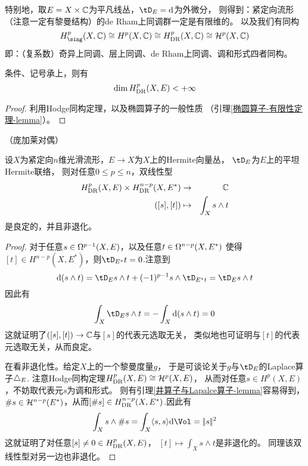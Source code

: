 
特别地，取$E=X\times\mathbb{C}$为平凡线丛，$\tD_E=\td$为外微分，
则得到：紧定向流形（注意一定有黎曼结构）的de Rham上同调群一定是有限维的。
以及我们有同构
$$
  H^p_{\sing}(X,\bbC)
\cong H^p(X,\bbC)
\cong H^p_{\DR}(X,\bbC)
\cong \mcalH^p(X,\bbC)
$$
即：（复系数）奇异上同调、层上同调、de Rham上同调、调和形式四者同构。

\begin{cor}条件、记号承上，则有
$$\dim H^{p}_{\operatorname{DR}}(X,E)<+\infty$$
\end{cor}

\begin{proof}
利用Hodge同构定理，以及椭圆算子的一般性质
（引理\ref{椭圆算子-有限性定理-lemma}）。
\end{proof}

\begin{thm}（庞加莱对偶）

设$X$为紧定向$n$维光滑流形，$E\to X$为$X$上的Hermite向量丛，
$\tD_E$为$E$上的平坦Hermite联络，
则对任意$0\leq p\leq n$，双线性型
\begin{eqnarray*}
     H^p_{\operatorname{DR}}(X,E)\times H^{n-p}_{\operatorname{DR}}(X,E^*)&\to&\mathbb{C}\\
     ([s],[t])&\mapsto&\int_Xs\wedge t
\end{eqnarray*}
是良定的，并且非退化。
\end{thm}

\begin{proof}
对于任意$s\in\Omega^{p-1}(X,E)$，以及任意$t\in\Omega^{n-p}(X,E^*)$
使得$[t]\in H^{n-p}(X,E^*)$，则$\tD_{E^*}t=0$.注意到
$$
  \td(s\wedge t)
=
  \tD_Es\wedge t+(-1)^{p-1}s\wedge\tD_{E^*t}
=
  \tD_Es\wedge t
$$
因此有
$$
  \int_X\tD_Es\wedge t=-\int_X\td(s\wedge t)=0
$$
这就证明了$([s],[t])\to\mathbb{C}$与$[s]$的代表元选取无关，
类似地也可证明与$[t]$的代表元选取无关，从而良定。

在看非退化性。给定$X$上的一个黎曼度量$g$，
于是可谈论关于$g$与$\tD_E$的Laplace算子$\triangle_E$.
注意Hodge同构定理$H^p_{\operatorname{DR}}(X,E)\cong\mathcal{H}^p(X,E)$，
从而对任意$s\in H^p(X,E)$，不妨取代表元$s$为调和形式。
则有引理\ref{井算子与Lapalce算子-lemma}容易得到，
$\#s\in\mathcal{H}^{n-p}(E^*)$，从而$[\#s]\in H^{n-p}_{\operatorname{DR}}(X,E^*)$.因此有
$$
  \int_Xs\wedge\#s
=
  \int_X\pair{s}{s}\td\Vol
=
  \norm{s}^2
$$
这就证明了对任意$[s]\neq 0\in H^p_{\operatorname{DR}}(X,E)$，
$[t]\mapsto\int_Xs\wedge t$是非退化的。
同理该双线性型对另一边也非退化。
\end{proof}

